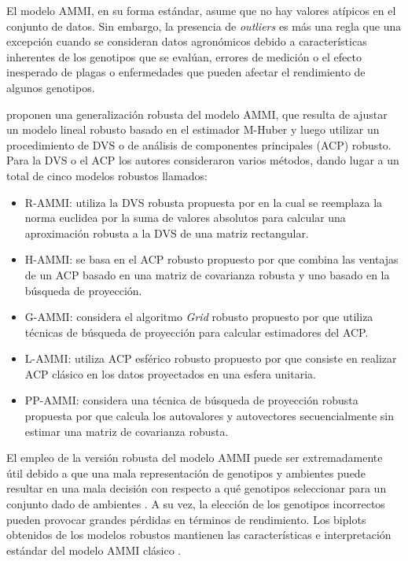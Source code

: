 El modelo AMMI, en su forma estándar, asume que no hay valores atípicos en el conjunto de datos. Sin embargo, la presencia de \emph{outliers} es más una regla que una excepción cuando se consideran datos agronómicos debido a características inherentes de los genotipos que se evalúan, errores de medición o el efecto inesperado de plagas o enfermedades que pueden afectar el rendimiento de algunos genotipos.

\citet{Rodriguesetal2016} proponen una generalización robusta del modelo AMMI, que resulta de ajustar un modelo lineal robusto basado en el estimador M-Huber \citep{Huber1981} y luego utilizar un procedimiento de DVS o de análisis de componentes principales (ACP) robusto. Para la DVS o el ACP los autores consideraron varios métodos, dando lugar a un total de cinco modelos robustos llamados: 

\begin{itemize}
\item R-AMMI: utiliza la DVS robusta propuesta por \citet{Hawkins2002RobustSV} en la cual se reemplaza la norma euclidea por la suma de valores absolutos para calcular una aproximación robusta a la DVS de una matriz rectangular.

\item H-AMMI: se basa en el ACP robusto propuesto por \citet{Hubert2005} que combina las ventajas de un ACP  basado en una matriz de covarianza robusta y uno basado en la búsqueda de proyección.

\item G-AMMI: considera el algoritmo \emph{Grid} robusto propuesto por \citet{Croux2007} que utiliza técnicas de búsqueda de proyección para calcular estimadores del ACP.

\item L-AMMI: utiliza ACP esférico robusto propuesto por \citet{Locantore1999} que consiste en realizar ACP clásico en los datos proyectados en una esfera unitaria.

\item PP-AMMI: considera una técnica de búsqueda de proyección robusta propuesta por \citet{Croux2005} que calcula los autovalores y autovectores secuencialmente sin estimar una matriz de covarianza robusta.
\end{itemize}

El empleo de la versión robusta del modelo AMMI puede ser extremadamente útil debido a que una mala representación de genotipos y ambientes puede resultar en una mala decisión con respecto a qué genotipos seleccionar para un conjunto dado de ambientes \citep{GauchZobel1997, Yanetal2000}. A su vez, la elección de los genotipos incorrectos pueden provocar grandes pérdidas en términos de rendimiento. Los biplots obtenidos de los modelos robustos mantienen las características e interpretación estándar del modelo AMMI clásico \citep{Rodriguesetal2016}.


